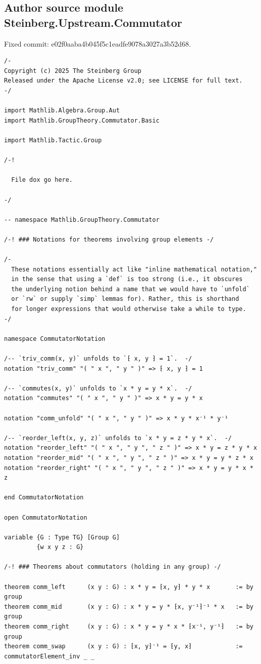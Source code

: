 \documentclass[10pt,a4paper]{article}
\begin{document}
\subsection*{Author source module Steinberg.Upstream.Commutator}
\noindent Fixed commit: e02f0aaba4b045f5c1eadfe9078a3027a3b52d68.
\begin{Verbatim}
/-
Copyright (c) 2025 The Steinberg Group
Released under the Apache License v2.0; see LICENSE for full text.
-/

import Mathlib.Algebra.Group.Aut
import Mathlib.GroupTheory.Commutator.Basic

import Mathlib.Tactic.Group

/-!

  File dox go here.

-/

-- namespace Mathlib.GroupTheory.Commutator

/-! ### Notations for theorems involving group elements -/

/-
  These notations essentially act like "inline mathematical notation,"
  in the sense that using a `def` is too strong (i.e., it obscures
  the underlying notion behind a name that we would have to `unfold`
  or `rw` or supply `simp` lemmas for). Rather, this is shorthand
  for longer expressions that would otherwise take a while to type.
-/

namespace CommutatorNotation

/-- `triv_comm(x, y)` unfolds to `⁅ x, y ⁆ = 1`.  -/
notation "triv_comm" "( " x ", " y " )" => ⁅ x, y ⁆ = 1

/-- `commutes(x, y)` unfolds to `x * y = y * x`.  -/
notation "commutes" "( " x ", " y " )" => x * y = y * x

notation "comm_unfold" "( " x ", " y " )" => x * y * x⁻¹ * y⁻¹

/-- `reorder_left(x, y, z)` unfolds to `x * y = z * y * x`.  -/
notation "reorder_left" "( " x ", " y ", " z " )" => x * y = z * y * x
notation "reorder_mid" "( " x ", " y ", " z " )" => x * y = y * z * x
notation "reorder_right" "( " x ", " y ", " z " )" => x * y = y * x * z

end CommutatorNotation

open CommutatorNotation

variable {G : Type TG} [Group G]
         {w x y z : G}

/-! ### Theorems about commutators (holding in any group) -/

theorem comm_left      (x y : G) : x * y = ⁅x, y⁆ * y * x       := by group
theorem comm_mid       (x y : G) : x * y = y * ⁅x, y⁻¹⁆⁻¹ * x   := by group
theorem comm_right     (x y : G) : x * y = y * x * ⁅x⁻¹, y⁻¹⁆   := by group
theorem comm_swap      (x y : G) : ⁅x, y⁆⁻¹ = ⁅y, x⁆            := commutatorElement_inv _ _


\end{Verbatim}
\end{document}
